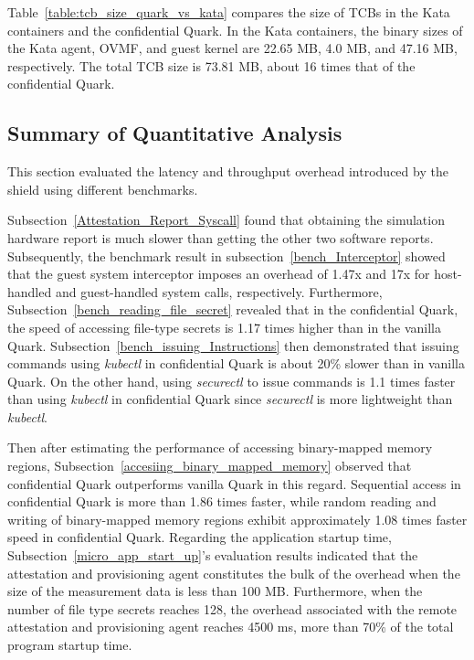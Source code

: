 Table~\ref{table:tcb_size_quark_vs_kata} compares the size of \acrshort{TCB}s in the Kata containers and the confidential Quark. In the Kata containers, the binary sizes of the Kata agent, OVMF, and guest kernel are 22.65 MB, 4.0 MB, and 47.16 MB, respectively. The total \acrshort{TCB} size is 
73.81 MB, about 16 times that of the confidential Quark.

\subsection{Summary of Quantitative Analysis}
\label{sec:qualitativ_sum}
This section evaluated the latency and throughput overhead introduced by the shield using different benchmarks.

Subsection~\ref{Attestation_Report_Syscall} found that obtaining the simulation hardware report is much slower than getting the other two software reports. Subsequently, the benchmark result in subsection~\ref*{bench_Interceptor} showed that the guest system interceptor 
imposes an overhead of 1.47x and 17x for host-handled and guest-handled system calls, respectively. Furthermore, Subsection~\ref{bench_reading_file_secret} revealed that in the confidential Quark, the speed of accessing file-type secrets is 1.17 times higher than in the vanilla Quark.
Subsection~\ref{bench_issuing_Instructions} then demonstrated that issuing commands using \emph{kubectl} in confidential Quark is about 20\% slower than in vanilla Quark. On the other hand, using \emph{securectl} to issue commands is 1.1 times faster than using \emph{kubectl} in confidential 
Quark since \emph{securectl} is more lightweight than \emph{kubectl}.

Then after estimating the performance of accessing binary-mapped memory regions, Subsection~\ref{accesiing_binary_mapped_memory} observed that confidential Quark outperforms vanilla Quark in this regard. Sequential access in confidential Quark is more than 1.86 times faster, while random reading and 
writing of binary-mapped memory regions exhibit approximately 1.08 times faster speed in confidential Quark. Regarding the application startup time, Subsection~\ref*{micro_app_start_up}’s evaluation results indicated that the attestation and provisioning agent constitutes the bulk of the overhead when the size of the measurement data is less than 100 MB. 
Furthermore, when the number of file type secrets reaches 128, the overhead associated with the remote attestation and provisioning agent reaches 4500 ms, more than 70\% of the total program startup time.

